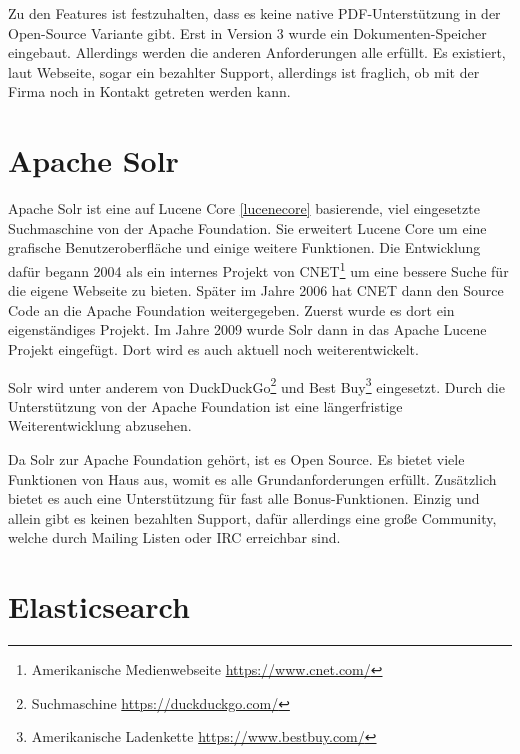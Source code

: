 Zu den Features ist festzuhalten, dass es keine native PDF-Unterstützung in der Open-Source Variante gibt. Erst in Version 3 wurde ein Dokumenten-Speicher eingebaut. Allerdings werden die anderen Anforderungen alle erfüllt. Es existiert, laut Webseite, sogar ein bezahlter Support, allerdings ist fraglich, ob mit der Firma noch in Kontakt getreten werden kann. \cite{SphinxTechnologiesInc.2019}

\section{Apache Solr}
\label{solr}

Apache Solr ist eine auf Lucene Core \ref{lucenecore} basierende, viel eingesetzte Suchmaschine von der Apache Foundation. Sie erweitert Lucene Core um eine grafische Benutzeroberfläche und einige weitere Funktionen. 
Die Entwicklung dafür begann 2004 als ein internes Projekt von CNET\footnote{Amerikanische Medienwebseite \url{https://www.cnet.com/}} um eine bessere Suche für die eigene Webseite zu bieten. Später im Jahre 2006 hat CNET dann den Source Code an die Apache Foundation weitergegeben. Zuerst wurde es dort ein eigenständiges Projekt. Im Jahre 2009 wurde Solr dann in das Apache Lucene Projekt eingefügt. Dort wird es auch aktuell noch weiterentwickelt. \cite{Wikipedia.2019b}

Solr wird unter anderem von DuckDuckGo\footnote{Suchmaschine \url{https://duckduckgo.com/}} und Best Buy\footnote{Amerikanische Ladenkette \url{https://www.bestbuy.com/}} eingesetzt. Durch die Unterstützung von der Apache Foundation ist eine längerfristige Weiterentwicklung abzusehen. 

Da Solr zur Apache Foundation gehört, ist es Open Source. Es bietet viele Funktionen von Haus aus, womit es alle Grundanforderungen erfüllt. Zusätzlich bietet es auch eine Unterstützung für fast alle Bonus-Funktionen. Einzig und allein gibt es keinen bezahlten Support, dafür allerdings eine große Community, welche durch Mailing Listen oder IRC erreichbar sind. \cite{TheApacheSoftwareFoundation.2019}

\section{Elasticsearch}
\label{elasticsearch}

